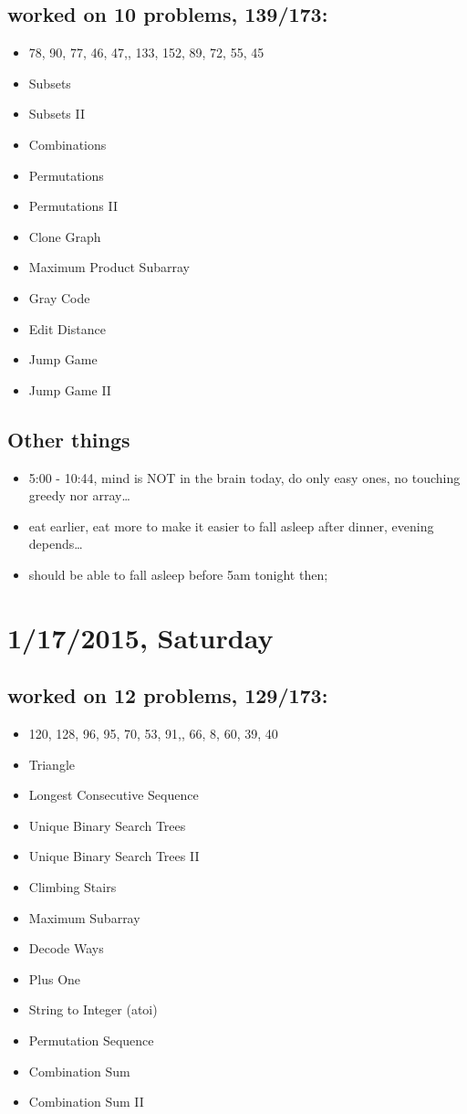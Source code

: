 \documentclass[9pt,b5paper]{article}
\begin{document}
\subsection{worked on 10 problems, 139/173:}
\label{sec-9-1}
\begin{itemize}
\item 78, 90, 77, 46, 47,, 133, 152, 89, 72, 55, 45
\item Subsets
\item Subsets II
\item Combinations
\item Permutations
\item Permutations II
\item Clone Graph
\item Maximum Product Subarray
\item Gray Code
\item Edit Distance
\item Jump Game
\item Jump Game II
\end{itemize}
\subsection{Other things}
\label{sec-9-2}
\begin{itemize}
\item 5:00 - 10:44, mind is NOT in the brain today, do only easy ones, no touching greedy nor array\ldots{}
\item eat earlier, eat more to make it easier to fall asleep after dinner, evening depends\ldots{}
\item should be able to fall asleep before 5am tonight then;
\end{itemize}
\section{1/17/2015, Saturday}
\label{sec-10}
\subsection{worked on 12 problems, 129/173:}
\label{sec-10-1}
\begin{itemize}
\item 120, 128, 96, 95, 70, 53, 91,, 66, 8, 60, 39, 40
\item Triangle
\item Longest Consecutive Sequence
\item Unique Binary Search Trees
\item Unique Binary Search Trees II
\item Climbing Stairs
\item Maximum Subarray
\item Decode Ways
\item Plus One
\item String to Integer (atoi)
\item Permutation Sequence
\item Combination Sum
\item Combination Sum II
\end{itemize}
\end{document}
